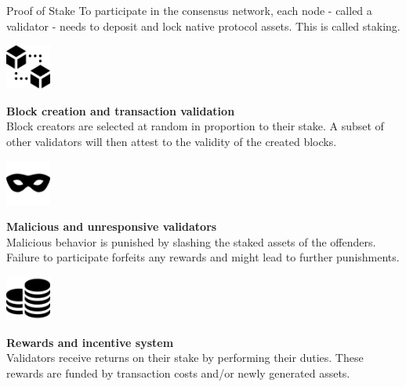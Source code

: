 \documentclass[handout]{beamer}
\begin{document}
	\begin{frame}{Proof of Stake}
		\small
		To participate in the consensus network, each node - called a validator - needs to \color{focus} deposit and lock native protocol assets\color{black}. This is called staking.
		
		\pause
		\vspace{1.5 em}
		\begin{minipage}{0.2\textwidth}
			\begin{center}
				\includegraphics[height=4em]{../assets/images/blocks}
			\end{center}
		\end{minipage}
		\begin{minipage}{0.7\textwidth}
			\textbf{Block creation and transaction validation} \\
			Block creators are selected at random in proportion to their stake. A subset of other validators will then attest to the validity of the created blocks.
		\end{minipage}
	
		\pause
		\vspace{1.5 em}
		\begin{minipage}{0.2\textwidth}
			\begin{center}
				\includegraphics[height=4em]{../assets/images/mask}
			\end{center}
		\end{minipage}
		\begin{minipage}{0.7\textwidth}
			\textbf{Malicious and unresponsive validators} \\
			Malicious behavior is punished by slashing the staked assets of the offenders. Failure to participate forfeits any rewards and might lead to further punishments.
		\end{minipage}
	
		\pause
		\vspace{1.5 em}
		\begin{minipage}{0.2\textwidth}
			\begin{center}
				\includegraphics[height=4em]{../assets/images/coin-stack}
			\end{center}
		\end{minipage}
		\begin{minipage}{0.7\textwidth}
			\textbf{Rewards and incentive system} \\
			Validators receive returns on their stake by performing their duties. These rewards are funded by transaction costs and/or newly generated assets.
		\end{minipage}
	\end{frame}
	
\end{document}
